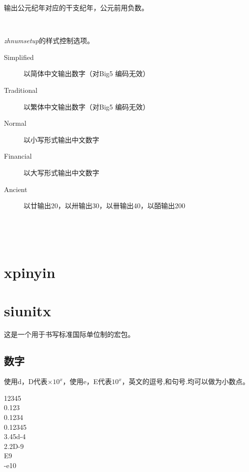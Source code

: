 输出公元纪年对应的干支纪年，公元前用负数。

\begin{codeshow}
 \\
\zhganzhinian{\year}
\end{codeshow}

\emph{zhnumsetup}的样式控制选项。

\begin{description}
    \item [Simplified] 以简体中文输出数字（对Big5 编码无效）
    \item [Traditional] 以繁体中文输出数字（对Big5 编码无效）
    \item [Normal] 以小写形式输出中文数字
    \item [Financial] 以大写形式输出中文数字
    \item [Ancient] 以廿输出20，以卅输出30，以卌输出40，以皕输出200
\end{description}

\begin{codeshow}
\\
\end{codeshow}

\begin{codeshow}
\\
\end{codeshow}

\section{xpinyin}

\section{siunitx}
这是一个用于书写标准国际单位制的宏包。

\subsection{数字}


使用d，D代表$\times10^{x}$，使用e，E代表$10^{x}$，英文的逗号,和句号.均可以做为小数点。

\begin{codeshow}
\num{12345} \\
\num{0.123} \\
\num{0,1234} \\
\num{.12345} \\
\num{3.45d-4} \\
\num{2.2D-9} \\
\num{E9} \\
\num{-e10}
\end{codeshow}

